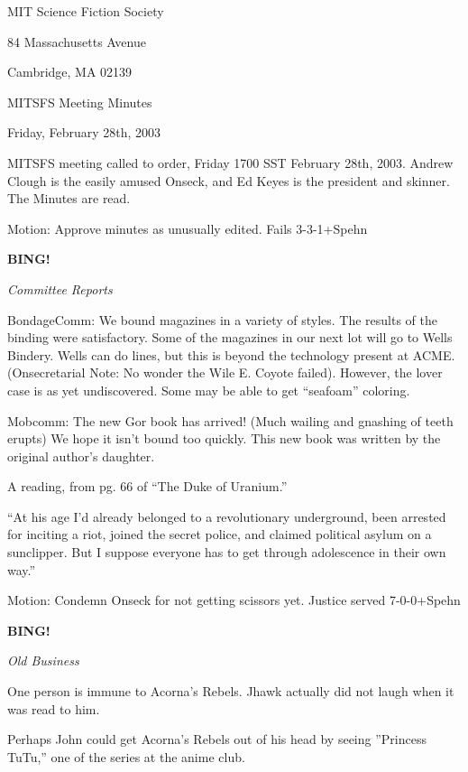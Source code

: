 \documentclass[12pt]{article}
\newcommand{\bing}{{\bf BING!} }
\newcommand{\goto}[1]{\bing \vskip 12pt \centerline{{\em{#1}}}}
\begin{document}
\begin{center}

MIT Science Fiction Society 

84 Massachusetts Avenue

Cambridge, MA 02139

\vspace{12pt}

MITSFS Meeting Minutes 

Friday, February 28th, 2003

\end{center}
 
\vspace{18pt}

\setlength{\parskip}{6pt}

\noindent
MITSFS meeting called to order, Friday 1700 SST February 28th, 2003.  Andrew Clough is the easily amused Onseck, and Ed Keyes is the president and skinner.  The Minutes are read.

Motion:  Approve minutes as unusually edited.  Fails 3-3-1+Spehn

\goto{Committee Reports}

BondageComm:  We bound magazines in a variety of styles.  The results of the binding were satisfactory.  Some of the magazines in our next lot will go to Wells Bindery.  Wells can do lines, but this is beyond the technology present at ACME.  (Onsecretarial Note:  No wonder the Wile E. Coyote failed).  However, the lover case is as yet undiscovered.  Some may be able to get ``seafoam'' coloring.

Mobcomm:  The new Gor book has arrived!  (Much wailing and gnashing of teeth erupts)  We hope it isn't bound too quickly.  This new book was written by the original author's daughter.

A reading, from pg. 66 of ``The Duke of Uranium.''  

``At his age I'd already belonged to a revolutionary underground, been arrested for inciting a riot, joined the secret police, and claimed political asylum on a sunclipper.  But I suppose everyone has to get through adolescence in their own way.''

Motion:  Condemn Onseck for not getting scissors yet.  Justice served 7-0-0+Spehn

\goto{Old Business}

One person is immune to Acorna's Rebels.  Jhawk actually did not laugh when it was read to him.

Perhaps John could get Acorna's Rebels out of his head by seeing ''Princess TuTu,'' one of the series at the anime club.
\end{document}
